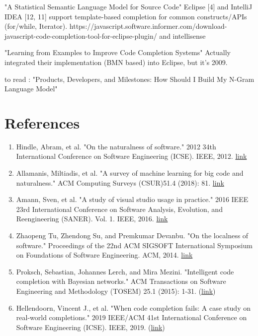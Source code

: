 "A Statistical Semantic Language Model for Source Code"
Eclipse [4] and IntelliJ IDEA [12, 11] support template-based completion for common
constructs/APIs (for/while, Iterator).
https://javascript.software.informer.com/download-javascript-code-completion-tool-for-eclipse-plugin/
and intellisense

"Learning from Examples to Improve Code Completion Systems"
Actually integrated their implementation (BMN based) into Eclipse, but it's 2009.

to read : "Products, Developers, and Milestones: How Should I Build My N-Gram Language Model"


\section{References}
\begin{enumerate}
	\item Hindle, Abram, et al. "On the naturalness of software." 2012 34th International Conference on Software Engineering (ICSE). IEEE, 2012. \href{http://citeseerx.ist.psu.edu/viewdoc/download?doi=10.1.1.221.1261&rep=rep1&type=pdf}{link}
	\item Allamanis, Miltiadis, et al. "A survey of machine learning for big code and naturalness." ACM Computing Surveys (CSUR)51.4 (2018): 81. \href{https://arxiv.org/pdf/1709.06182.pdf}{link}
	\item Amann, Sven, et al. "A study of visual studio usage in practice." 2016 IEEE 23rd International Conference on Software Analysis, Evolution, and Reengineering (SANER). Vol. 1. IEEE, 2016. \href{https://sarahnadi.org/resources/pubs/Amann_SANER16.pdf}{link}
	\item Zhaopeng Tu, Zhendong Su, and Premkumar Devanbu. "On the localness of software." Proceedings of the 22nd ACM SIGSOFT International Symposium on Foundations of Software Engineering. ACM, 2014. \href{http://zptu.net/papers/fse2014_localness.pdf}{link}
	\item Proksch, Sebastian, Johannes Lerch, and Mira Mezini. "Intelligent code completion with Bayesian networks." ACM Transactions on Software Engineering and Methodology (TOSEM) 25.1 (2015): 1-31. (\href{https://ieeexplore.ieee.org/stamp/stamp.jsp?arnumber=8812116}{link})
	\item Hellendoorn, Vincent J., et al. "When code completion fails: A case study on real-world completions." 2019 IEEE/ACM 41st International Conference on Software Engineering (ICSE). IEEE, 2019. (\href{https://dl.acm.org/doi/pdf/10.1145/2744200}{link})
\end{enumerate}